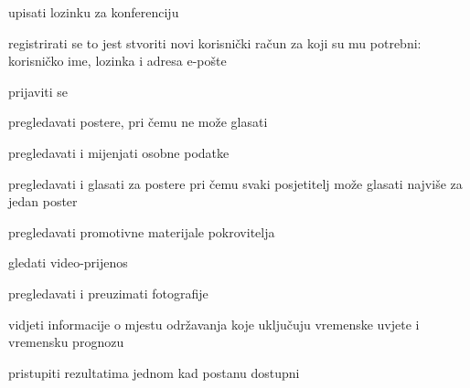 			\begin{packed_enum}
				\item  {}
				
				\begin{packed_enum}
					
					\item upisati lozinku za konferenciju
					
				\end{packed_enum}
				
				\item  {}
				
				\begin{packed_enum}
					
					\item registrirati se to jest stvoriti novi korisnički račun za koji su mu potrebni: korisničko ime, lozinka i adresa e-pošte
					\item prijaviti se
					\item pregledavati postere, pri čemu ne može glasati
					
				\end{packed_enum}
			
				\item  {}
				
				\begin{packed_enum}
					
					\item pregledavati i mijenjati osobne podatke
					\item pregledavati i glasati za postere pri čemu svaki posjetitelj može glasati najviše za jedan poster
					\item pregledavati promotivne materijale pokrovitelja
					\item gledati video-prijenos
					\item pregledavati i preuzimati fotografije
					\item vidjeti informacije o mjestu održavanja koje uključuju vremenske uvjete i vremensku prognozu
					\item pristupiti rezultatima jednom kad postanu dostupni
				
				\end{packed_enum}
				
				\item  {}
				

\end{packed_enum}
